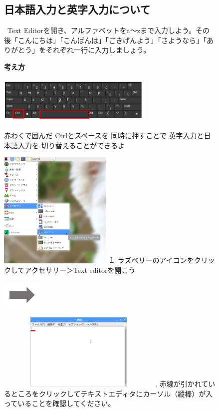 \documentclass[a4paper,12pt]{jarticle}
\begin{document}
\clearpage
\begin{figure}[ht]
  \subsection{\theExercise 日本語入力と英字入力について}
  \ Text
  Editorを開き、アルファベットをa〜zまで入力しよう。その後「こんにちは」「こんばんは」「ごきげんよう」「さようなら」「ありがとう」をそれぞれ一行に入力しましょう。

  {\bf\large 考え方}


  \centering
  \begin{minipage}{\textwidth}
    \includegraphics[width=7.459cm,height=2.245cm]{textbook-img065.png}
    \raisebox{10mm}
    {
      \begin{minipage}{0.5\textwidth}
        赤わくで囲んだ
        Ctrlとスペースを
        同時に押すことで
        英字入力と日本語入力を
        切り替えることができるよ
      \end{minipage}
    }
  \end{minipage}

  \begin{minipage}{6.984cm}
    \includegraphics[width=5.408cm,height=5.595cm]{textbook-img064.png}
    \flushleft
    １
    ラズベリーのアイコンをクリックしてアクセサリー＞Text
    editorを開こう
  \end{minipage}
  \includegraphics[width=1.919cm,height=1.365cm]{textbook-img053.png}
  \begin{minipage}{7.347cm}
    \includegraphics[width=7.897cm,height=3.655cm]{textbook-img063.png}
    .
    赤線が引かれているところをクリックしてテキストエディタにカーソル（縦棒）が入っていることを確認してください。
  \end{minipage}


\end{figure}
\end{document}
